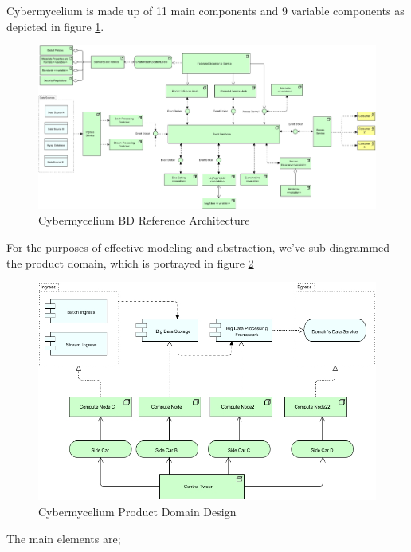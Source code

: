 \documentclass[review]{elsarticle}
\begin{document}
Cybermycelium is made up of 11 main components and 9 variable components as depicted in figure \ref{fig:Cybermycelium}.

\begin{figure}
        \includegraphics[width=23cm]{Media/Cybermycelium.jpg}
        \caption{Cybermycelium BD Reference Architecture}
        \label{fig:Cybermycelium}
\end{figure}


For the purposes of effective modeling and abstraction, we've sub-diagrammed the product domain, which is portrayed in figure \ref{fig:Cybermycelium Product Domain Design}

\begin{figure}[h!]
    \centering
    \includegraphics[width=12cm]{Media/Product Domain.jpg}
    \caption{Cybermycelium Product Domain Design}
    \label{fig:Cybermycelium Product Domain Design}
\end{figure}

The main elements are;
\end{document}
